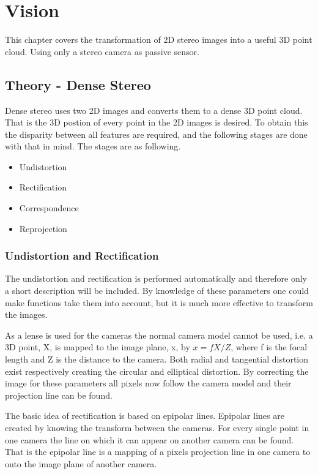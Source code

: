 \chapter{Vision}


This chapter covers the transformation of 2D stereo images into a useful 3D point cloud. Using only a stereo camera as passive sensor.

\section{Theory - Dense Stereo}

Dense stereo uses two 2D images and converts them to a dense 3D point cloud. That is the 3D postion of every point in the 2D images is desired. To obtain this the disparity between all features are required, and the following stages are done with that in mind. The stages are as following.

\begin{itemize}
  \item Undistortion
  \item Rectification
  \item Correspondence
  \item Reprojection
\end{itemize}


\subsection{Undistortion and Rectification}


The undistortion and rectification is performed automatically and therefore only a short description will be included. By knowledge of these parameters one could make functions take them into account, but it is much more effective to transform the images.

As a lense is used for the cameras the normal camera model cannot be used, i.e. a 3D point, X, is mapped to the image plane, x, by $ x = f X/Z $, where f is the focal length and Z is the distance to the camera. Both radial and tangential distortion exist respectively creating the circular and elliptical distortion. By correcting the image for these parameters all pixels now follow the camera model and their projection line can be found.

The basic idea of rectification is based on epipolar lines. Epipolar lines are created by knowing the transform between the cameras. For every single point in one camera the line on which it can appear on another camera can be found. That is the epipolar line is a mapping of a pixels projection line in one camera to onto the image plane of another camera. 

